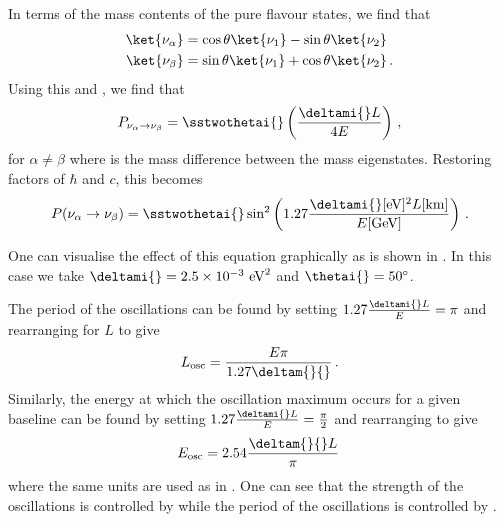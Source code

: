 In terms of the mass contents of the pure flavour states, we find that
\begin{align}
  \ket{\nu_{\alpha}} &= \cos\theta\ket{\nu_{1}} - \sin\theta\ket{\nu_{2}} \\
  \ket{\nu_{\beta}}  &= \sin\theta\ket{\nu_{1}} + \cos\theta\ket{\nu_{2}} \, .
\end{align}
Using this and , we find that
\begin{equation}
  P_{\nu_{\alpha}\rightarrow\nu_{\beta}} = \sstwothetai{} \left(\frac{\deltami{} L}{4E} \right) \, ,
\end{equation}
for $\alpha \neq \beta$ where \deltami{} is the mass difference between the mass eigenstates.
Restoring factors of $\hbar$ and $c$, this becomes
\begin{equation}
  P(\nu_{\alpha}\rightarrow\nu_{\beta}) = \sstwothetai{} \sin^{2} \left( 1.27 \frac{\deltami{} [\text{eV}]^{2} L [\text{km}]}{E[\text{GeV}]} \right) \, .
  \label{eq:twoNuProb}
\end{equation}

One can visualise the effect of this equation graphically as is shown in . 
In this case we take $\deltami{} = 2.5 \times 10^{-3}~\text{eV}^{2}$ and $\thetai{} = 50^{\circ}$.

The period of the oscillations can be found by setting $1.27 \frac{\deltami{}L}{E} = \pi$ and rearranging for $L$ to give
\begin{equation}
  L_{\text{osc}} = \frac{E \pi}{1.27 \deltam{}{}} \, .
\end{equation}
Similarly, the energy at which the oscillation maximum occurs for a given baseline can be found by setting $1.27 \frac{\deltami{}L}{E} = \frac{\pi}{2}$ and rearranging to give
\begin{equation}
  E_{\text{osc}} = 2.54 \frac{\deltam{}{} L}{\pi} \,
\end{equation}
where the same units are used as in .
One can see that the strength of the oscillations is controlled by \sstwothetai{} while the period of the oscillations is controlled by \deltami{}.

